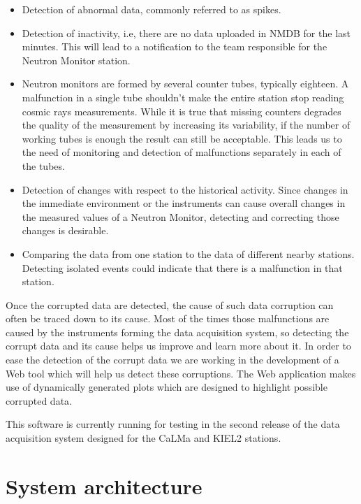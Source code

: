 \documentclass[a4paper]{jpconf}
\begin{document}
\begin{itemize}
	\item   Detection of abnormal data, commonly referred to as spikes.
    \item   Detection of inactivity, i.e, there are no data uploaded in NMDB for
        the last minutes. This will lead to a notification to the team
        responsible for the Neutron Monitor station. 
    \item Neutron monitors are formed by several counter tubes, typically
        eighteen. A malfunction in a single tube shouldn't make the entire
        station stop reading cosmic rays measurements. While it is true that
        missing counters degrades the quality of the measurement by increasing its
        variability, if the number of working tubes is enough the result can
        still be acceptable. This leads us to the need of monitoring and
        detection of malfunctions separately in each of the tubes.  
    \item Detection of changes with respect to the historical activity.
        Since changes in the immediate environment or the instruments can cause
        overall changes in the measured values of a Neutron Monitor, detecting
        and correcting those changes is desirable.
    \item Comparing the data from one station to the data of different nearby
        stations. Detecting isolated events could indicate that there is a
        malfunction in that station.	
\end{itemize}

Once the corrupted data are detected, the cause of such data corruption can
often be traced down to its cause. Most of the times those malfunctions are
caused by the instruments forming the data acquisition system, so detecting the
corrupt data and its cause helps us improve and learn more about it. In order to
ease the detection of the corrupt data we are working in the development of a
Web tool which will help us detect these corruptions. The Web application makes
use of dynamically generated plots which are designed to highlight possible
corrupted data.

This software is currently running for testing in the second release of the data
acquisition system\cite{Garcia2014} designed for the CaLMa\cite{Medina2013} and
KIEL2 stations.


\section{System architecture}
\end{document}
